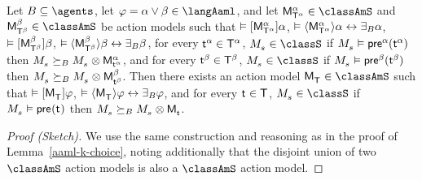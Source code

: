 \begin{lemma}\label{aaml-s-choice}
Let $\agentsB \subseteq \agents$, 
let $\phi = \alpha \lor \beta \in \langAaml$, and 
let $\aPModel[\alpha]{\aStatesT[\alpha]} \in \classAmS$ and $\aPModel[\beta]{\aStatesT[\beta]} \in \classAmS$ be action models such that 
$\entails \actionA{\aPModel[\alpha]{\aStatesT[\alpha]}} \alpha$, 
$\entails \actionE{\aPModel[\alpha]{\aStatesT[\alpha]}} \alpha \iff \someactsBs \alpha$, 
$\entails \actionA{\aPModel[\beta]{\aStatesT[\beta]}} \beta$,
$\entails \actionE{\aPModel[\beta]{\aStatesT[\beta]}} \beta \iff \someactsBs \beta$,
for every $\aStateT[\alpha] \in \aStatesT[\alpha]$, $\kPModel{\kStateS} \in \classS$ if $\kPModel{\kStateS} \entails \aPrecondition[\alpha](\aStateT[\alpha])$ then $\kPModel{\kStateS} \simulatesBs \kPModel{\kStateS} \exec \aPModel[\alpha]{\aStateT[\alpha]}$, and
for every $\aStateT[\beta] \in \aStatesT[\beta]$, $\kPModel{\kStateS} \in \classS$ if $\kPModel{\kStateS} \entails \aPrecondition[\beta](\aStateT[\beta])$ then $\kPModel{\kStateS} \simulatesBs \kPModel{\kStateS} \exec \aPModel[\beta]{\aStateT[\beta]}$.
Then there exists an action model $\aPModel{\aStatesT} \in \classAmS$ such that 
$\entails \actionA{\aPModel{\aStatesT}} \phi$,
$\entails \actionE{\aPModel{\aStatesT}} \phi \iff \someactsBs \phi$, and
for every $\aStateT \in \aStatesT$, $\kPModel{\kStateS} \in \classS$ if $\kPModel{\kStateS} \entails \aPrecondition(\aStateT)$ then $\kPModel{\kStateS} \simulatesBs \kPModel{\kStateS} \exec \aPModel{\aStateT}$.
\end{lemma}

\begin{proof}[Proof (Sketch)]
We use the same construction and reasoning as in the proof of Lemma~\ref{aaml-k-choice}, noting additionally that the disjoint union of two $\classAmS$ action models is also a $\classAmS$ action model.
\end{proof}

